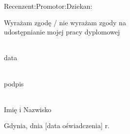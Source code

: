 \documentclass[a4paper,12pt,twoside,openright]{book}
\begin{document}
    
    \vspace{1.5cm}
    \noindent
    \footnotesize
    Recenzent:\dotfill Promotor:\dotfill Dziekan:\dotfill

    \vfill
    \begin{flushright}
        \begin{minipage}{.5\linewidth}
            \begin{center}
            	\scriptsize
                Wyrażam zgodę / nie wyrażam zgody na\\
                udostępnianie mojej pracy dyplomowej
                
                \vspace{1cm}
                \begin{minipage}{.37\linewidth}
                    \begin{center}
                        \dotfill \\
                        data
                    \end{center}
                \end{minipage}
                \begin{minipage}{.47\linewidth}
                    \begin{center}
                        \vspace{0.1cm}
                        \dotfill \\
                        podpis
                    \end{center}
                \end{minipage}
            \end{center}
        \end{minipage}
    \end{flushright}
    
    \newpage
    
    \thispagestyle{empty}
    
   \vspace*{1cm}
    \noindent
    \begin{minipage}{0.5\linewidth}
        \begin{flushleft}
            \begin{minipage}{.8\linewidth}
                \begin{center}
                    \dotfill \\
                    Imię i Nazwisko
                \end{center}
            \end{minipage}
        \end{flushleft}
    \end{minipage}
    \begin{minipage}{0.5\linewidth}
        \begin{flushright}
                Gdynia, dnia [data oświadczenia] r.\\
                \hfill
        \end{flushright}
    \end{minipage}
    
\end{document}
